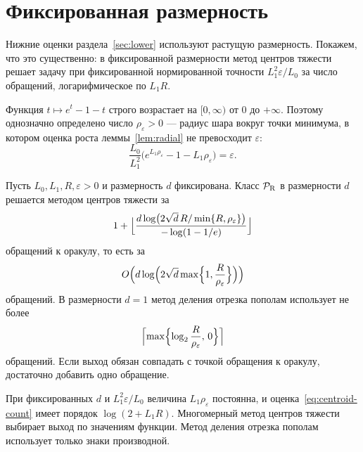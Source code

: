 \section{Фиксированная размерность}\label{app:fixed-dim}

Нижние оценки раздела~\ref{sec:lower} используют растущую размерность. Покажем, что это существенно: в фиксированной размерности метод центров тяжести решает задачу при фиксированной нормированной точности $L_1^2\varepsilon/L_0$ за число обращений, логарифмическое по $L_1R$.

Функция $t\mapsto e^t-1-t$ строго возрастает на $[0,\infty)$ от $0$ до $+\infty$. Поэтому однозначно определено число $\rho_\varepsilon>0$ --- радиус шара вокруг точки минимума, в котором оценка роста леммы~\ref{lem:radial} не превосходит $\varepsilon$:
\begin{equation}\label{eq:fixed-radius}
 \frac{L_0}{L_1^2}\bigl(e^{L_1\rho_\varepsilon}-1-L_1\rho_\varepsilon\bigr)=\varepsilon .
\end{equation}

\begin{proposition}\label{prop:fixed-dim}
Пусть $L_0,L_1,R,\varepsilon>0$ и размерность $d$ фиксирована. Класс $\mathcal P_{\rm R}$ в размерности $d$ решается методом центров тяжести за
\begin{equation}\label{eq:centroid-count}
 1+\Bigl\lfloor\frac{d\log\bigl(2\sqrt d\,R/\min\{R,\rho_\varepsilon\}\bigr)}{-\log(1-1/e)}\Bigr\rfloor
\end{equation}
обращений к оракулу, то есть за
\[
 O\Bigl(d\log\Bigl(2\sqrt d\max\Bigl\{1,\frac R{\rho_\varepsilon}\Bigr\}\Bigr)\Bigr)
\]
обращений. В размерности $d=1$ метод деления отрезка пополам использует не более
\begin{equation}\label{eq:one-dim-count}
 \Bigl\lceil\max\Bigl\{\log_2\frac R{\rho_\varepsilon},\,0\Bigr\}\Bigr\rceil
\end{equation}
обращений. Если выход обязан совпадать с точкой обращения к оракулу, достаточно добавить одно обращение.
\end{proposition}

При фиксированных $d$ и $L_1^2\varepsilon/L_0$ величина $L_1\rho_\varepsilon$ постоянна, и оценка~\eqref{eq:centroid-count} имеет порядок $\log(2+L_1R)$. Многомерный метод центров тяжести выбирает выход по значениям функции. Метод деления отрезка пополам использует только знаки производной.

